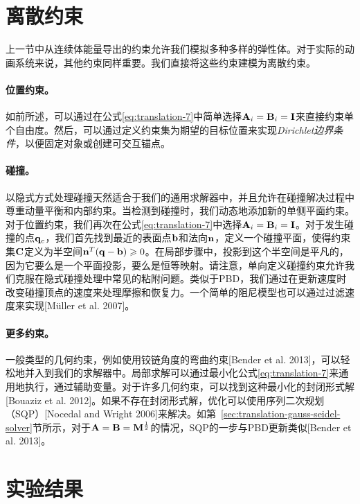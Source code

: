 \begin{translation}
\section{离散约束}

上一节中从连续体能量导出的约束允许我们模拟多种多样的弹性体。对于实际的动画系统来说，其他约束同样重要。我们直接将这些约束建模为离散约束。

\paragraph{位置约束。}

如前所述，可以通过在公式\eqref{eq:translation-7}中简单选择$\vb{A}_i = \vb{B}_i = \vb{I}$来直接约束单个自由度。然后，可以通过定义约束集为期望的目标位置来实现\emph{Dirichlet边界条件}，以便固定对象或创建可交互锚点。

\paragraph{碰撞。}

以隐式方式处理碰撞天然适合于我们的通用求解器中，并且允许在碰撞解决过程中尊重动量平衡和内部约束。当检测到碰撞时，我们动态地添加新的单侧平面约束。对于位置约束，我们再次在公式\eqref{eq:translation-7}中选择$\vb{A}_i = \vb{B}_i = \vb{I}$。对于发生碰撞的点$\vb{q}_c$，我们首先找到最近的表面点$\vb{b}$和法向$\vb{n}$，定义一个碰撞平面，使得约束集$\vb{C}$定义为半空间$\vb{n}^T (\vb{q} - \vb{b}) \geqslant 0$。在局部步骤中，投影到这个半空间是平凡的，因为它要么是一个平面投影，要么是恒等映射。请注意，单向定义碰撞约束允许我们克服在隐式碰撞处理中常见的粘附问题。类似于PBD，我们通过在更新速度时改变碰撞顶点的速度来处理摩擦和恢复力。一个简单的阻尼模型也可以通过过滤速度来实现[Müller et al. 2007]。

\paragraph{更多约束。}

一般类型的几何约束，例如使用铰链角度的弯曲约束[Bender et al. 2013]，可以轻松地并入到我们的求解器中。局部求解可以通过最小化公式\eqref{eq:translation-7}来通用地执行，通过辅助变量。对于许多几何约束，可以找到这种最小化的封闭形式解[Bouaziz et al. 2012]。如果不存在封闭形式解，优化可以使用序列二次规划（SQP）[Nocedal and Wright 2006]来解决。如第~\ref{sec:translation-gauss-seidel-solver}节所示，对于$\vb{A} = \vb{B} = \vb{M}^{\frac{1}{2}}$的情况，SQP的一步与PBD更新类似[Bender et al. 2013]。

\section{实验结果}


\end{translation}
